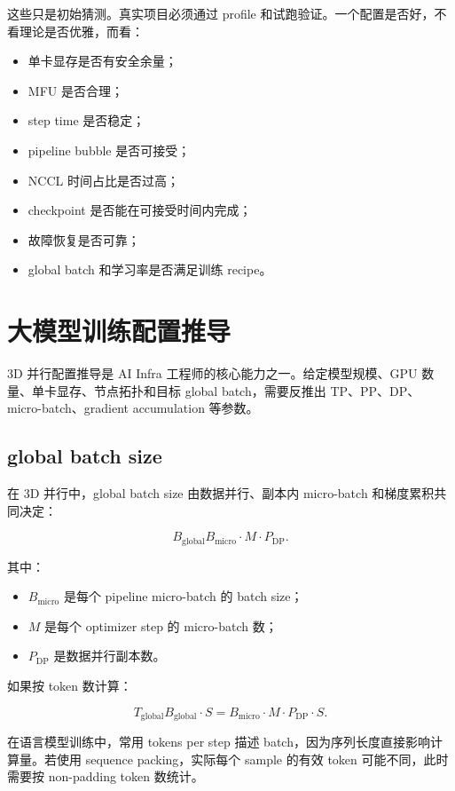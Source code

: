 这些只是初始猜测。真实项目必须通过 profile 和试跑验证。一个配置是否好，不看理论是否优雅，而看：

\begin{itemize}
\item 单卡显存是否有安全余量；
\item MFU 是否合理；
\item step time 是否稳定；
\item pipeline bubble 是否可接受；
\item NCCL 时间占比是否过高；
\item checkpoint 是否能在可接受时间内完成；
\item 故障恢复是否可靠；
\item global batch 和学习率是否满足训练 recipe。
\end{itemize}

\section{大模型训练配置推导}
\label{sec:large-model-training-config-derivation}

3D 并行配置推导是 AI Infra 工程师的核心能力之一。给定模型规模、GPU 数量、单卡显存、节点拓扑和目标 global batch，需要反推出 TP、PP、DP、micro-batch、gradient accumulation 等参数。

\subsection{global batch size}
\label{subsec:global-batch-size}

在 3D 并行中，global batch size 由数据并行、副本内 micro-batch 和梯度累积共同决定：

\[
B_{\mathrm{global}}
B_{\mathrm{micro}}
\cdot
M
\cdot
P_{\mathrm{DP}}.
\]

其中：

\begin{itemize}
\item $B_{\mathrm{micro}}$ 是每个 pipeline micro-batch 的 batch size；
\item $M$ 是每个 optimizer step 的 micro-batch 数；
\item $P_{\mathrm{DP}}$ 是数据并行副本数。
\end{itemize}

如果按 token 数计算：

\[
T_{\mathrm{global}}
B_{\mathrm{global}}
\cdot
S
=
B_{\mathrm{micro}}
\cdot
M
\cdot
P_{\mathrm{DP}}
\cdot
S.
\]

在语言模型训练中，常用 tokens per step 描述 batch，因为序列长度直接影响计算量。若使用 sequence packing，实际每个 sample 的有效 token 可能不同，此时需要按 non-padding token 数统计。

